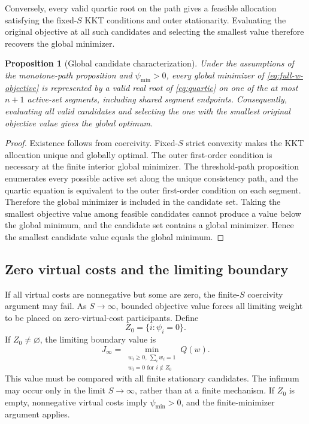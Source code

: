 \documentclass[11pt,a4paper]{article}
\newtheorem{proposition}{Proposition}
\newcommand{\1}{\mathbf{1}}
\begin{document}
Conversely, every valid quartic root on the path gives a feasible
allocation satisfying the fixed-\(S\) KKT conditions and outer
stationarity. Evaluating the original objective at all such candidates
and selecting the smallest value therefore recovers the global
minimizer.

\begin{proposition}[Global candidate characterization]
Under the assumptions of the monotone-path proposition and
\(\psi_{\min}>0\), every global minimizer of
\eqref{eq:full-w-objective} is represented by a valid real root of
\eqref{eq:quartic} on one of the at most \(n+1\) active-set segments,
including shared segment endpoints. Consequently, evaluating all valid
candidates and selecting the one with the smallest original objective
value gives the global optimum.
\end{proposition}

\begin{proof}
Existence follows from coercivity. Fixed-\(S\) strict convexity makes
the KKT allocation unique and globally optimal. The outer first-order
condition is necessary at the finite interior global minimizer.
The threshold-path proposition enumerates every possible active set
along the unique consistency path, and the quartic equation is
equivalent to the outer first-order condition on each segment.
Therefore the global minimizer is included in the candidate set.
Taking the smallest objective value among feasible candidates cannot
produce a value below the global minimum, and the candidate set contains
a global minimizer. Hence the smallest candidate value equals the
global minimum.
\end{proof}

\subsection{Zero virtual costs and the limiting boundary}

If all virtual costs are nonnegative but some are zero, the finite-\(S\)
coercivity argument may fail. As \(S\to\infty\), bounded objective
value forces all limiting weight to be placed on zero-virtual-cost
participants. Define
\[
  Z_0=\{i:\psi_i=0\}.
\]
If \(Z_0\neq\varnothing\), the limiting boundary value is
\begin{equation}
  \boxed{
  J_\infty
  =
  \min_{\substack{w_i\geq0,\ \sum_iw_i=1\\
                  w_i=0\text{ for }i\notin Z_0}}
  Q(w).
  }
  \label{eq:infinite-boundary}
\end{equation}
This value must be compared with all finite stationary candidates.
The infimum may occur only in the limit \(S\to\infty\), rather than at
a finite mechanism. If \(Z_0\) is empty, nonnegative virtual costs
imply \(\psi_{\min}>0\), and the finite-minimizer argument applies.
\end{document}
